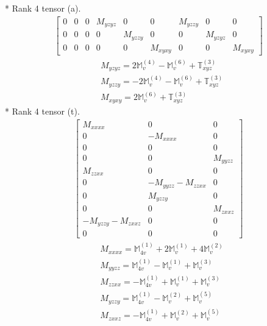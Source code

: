 \documentclass[fleqn,8pt,landscape]{jsarticle}
\begin{document}
* Rank 4 tensor (a).
\begin{align*}
\begin{bmatrix} 0 & 0 & 0 & M_{yzyz} & 0 & 0 & M_{yzzy} & 0 & 0 \\ 0 & 0 & 0 & 0 & M_{yzzy} & 0 & 0 & M_{yzyz} & 0 \\ 0 & 0 & 0 & 0 & 0 & M_{xyxy} & 0 & 0 & M_{xyxy} \end{bmatrix}
\end{align*}
\begin{align*}
& M_{yzyz} = 2 \mathbb{M}_{v}^{(4)} - \mathbb{M}_{v}^{(6)} + \mathbb{T}_{xyz}^{(3)} \\
& M_{yzzy} = - 2 \mathbb{M}_{v}^{(4)} - \mathbb{M}_{v}^{(6)} + \mathbb{T}_{xyz}^{(3)} \\
& M_{xyxy} = 2 \mathbb{M}_{v}^{(6)} + \mathbb{T}_{xyz}^{(3)}
\end{align*}
* Rank 4 tensor (t).
\begin{align*}
\begin{bmatrix} M_{xxxx} & 0 & 0 \\ 0 & - M_{xxxx} & 0 \\ 0 & 0 & 0 \\ 0 & 0 & M_{yyzz} \\ M_{zzxx} & 0 & 0 \\ 0 & - M_{yyzz} - M_{zzxx} & 0 \\ 0 & M_{yzzy} & 0 \\ 0 & 0 & M_{zxxz} \\ - M_{yzzy} - M_{zxxz} & 0 & 0 \\ 0 & 0 & 0 \end{bmatrix}
\end{align*}
\begin{align*}
& M_{xxxx} = \mathbb{M}_{4v}^{(1)} + 2 \mathbb{M}_{v}^{(1)} + 4 \mathbb{M}_{v}^{(2)} \\
& M_{yyzz} = \mathbb{M}_{4v}^{(1)} - \mathbb{M}_{v}^{(1)} + \mathbb{M}_{v}^{(3)} \\
& M_{zzxx} = - \mathbb{M}_{4v}^{(1)} + \mathbb{M}_{v}^{(1)} + \mathbb{M}_{v}^{(3)} \\
& M_{yzzy} = \mathbb{M}_{4v}^{(1)} - \mathbb{M}_{v}^{(2)} + \mathbb{M}_{v}^{(5)} \\
& M_{zxxz} = - \mathbb{M}_{4v}^{(1)} + \mathbb{M}_{v}^{(2)} + \mathbb{M}_{v}^{(5)}
\end{align*}
\end{document}
